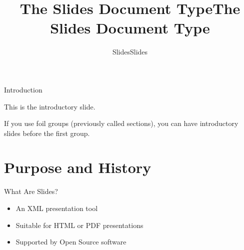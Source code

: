 \documentclass[pdf,frames,slideColor, rcas]{prosper}
\title{{\black The Slides Document Type}}
\subtitle{{\black Slides}}
\author{{\black }}
\renewcommand{\slideparindent}{0mm}
\begin{document}
\maketitle
\title{{\black The Slides Document Type}}
\subtitle{{\black Slides}}
\author{{\black }}

\renewcommand{\slideparindent}{0mm}

\begin{slide}{Introduction}
\label{id2718407}

This is the introductory slide.

If you use foil groups (previously called sections), you can
have introductory slides before the first group.
\end{slide}
                                                                        

\part{Purpose and History            }
\label{id2718425}


\begin{slide}{What Are Slides?}
\label{id2718436}
\begin{itemize}

	\item 
An XML presentation tool



	\item 
Suitable for HTML or PDF presentations



	\item 
Supported by Open Source software


\end{itemize}
\end{slide}
\end{document}
